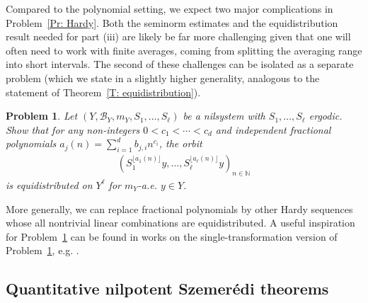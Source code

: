 \documentclass[11pt]{amsart}
\newtheorem{problem}{Problem}
\theoremstyle{definition}
\newcommand{\N}{{\mathbb N}}
\newcommand{\CB}{{\mathcal B}}
\newcommand{\1}{{\mathbf{1}}}
\newcommand{\sfloor}[1]{{\lfloor #1 \rfloor}}
\begin{document}
Compared to the polynomial setting, we expect two major complications in Problem~\ref{Pr: Hardy}. Both the seminorm estimates and the equidistribution result needed for part (iii) are likely be far more challenging given that one will often need to work with finite averages, coming from splitting the averaging range into short intervals. The second of these challenges can be isolated as a separate problem (which we state in a slightly higher generality, analogous to the statement of Theorem~\ref{T: equidistribution}).
\begin{problem}\label{Pr: Hardy equidistribution}
    Let $(Y, \CB_Y, m_Y, S_1, \ldots, S_\ell)$ be a nilsystem with $S_1, \ldots, S_\ell$ ergodic. Show that for any non-integers $0< c_1 < \cdots <c_d$ and  independent fractional polynomials $a_j(n) = \sum_{i=1}^d b_{j,i}n^{c_i}$, the orbit
    \begin{align*}
        (S_1^{\sfloor{a_1(n)}}y, \ldots, S_\ell^{\sfloor{a_\ell(n)}}y)_{n\in\N}
    \end{align*}
    is equidistributed on $Y^\ell$ for $m_Y$-a.e. $y\in Y$.
\end{problem}
More generally, we can replace fractional polynomials by other Hardy sequences whose all nontrivial linear combinations are equidistributed. A useful inspiration for Problem~\ref{Pr: Hardy equidistribution} can be found in works on the single-transformation version of Problem~\ref{Pr: Hardy equidistribution}, e.g. \cite{Fr09, Fr10, R22, Ts24}.



\subsection{Quantitative nilpotent Szemer\'edi theorems}
\end{document}
